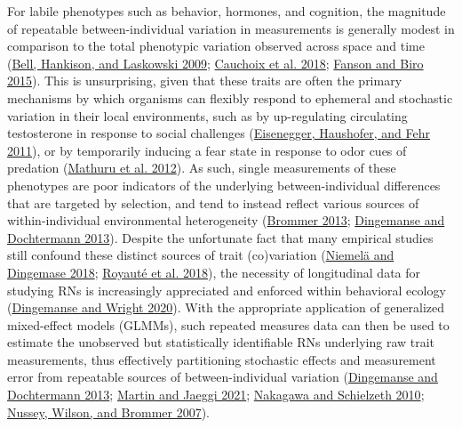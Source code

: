 \documentclass{article}
\begin{document}
For labile phenotypes such as behavior, hormones, and cognition, the
magnitude of repeatable between-individual variation in measurements is
generally modest in comparison to the total phenotypic variation
observed across space and time (\protect\hyperlink{ref-Bell2009}{Bell,
Hankison, and Laskowski 2009};
\protect\hyperlink{ref-Cauch2018}{Cauchoix et al. 2018};
\protect\hyperlink{ref-Fanson2019}{Fanson and Biro 2015}). This is
unsurprising, given that these traits are often the primary mechanisms
by which organisms can flexibly respond to ephemeral and stochastic
variation in their local environments, such as by up-regulating
circulating testosterone in response to social challenges
(\protect\hyperlink{ref-Eis2011}{Eisenegger, Haushofer, and Fehr 2011}),
or by temporarily inducing a fear state in response to odor cues of
predation (\protect\hyperlink{ref-Mathuru2012}{Mathuru et al. 2012}). As
such, single measurements of these phenotypes are poor indicators of the
underlying between-individual differences that are targeted by
selection, and tend to instead reflect various sources of
within-individual environmental heterogeneity
(\protect\hyperlink{ref-Brommer2013}{Brommer 2013};
\protect\hyperlink{ref-DingDocht2013}{Dingemanse and Dochtermann 2013}).
Despite the unfortunate fact that many empirical studies still confound
these distinct sources of trait (co)variation
(\protect\hyperlink{ref-Niem2018}{Niemelä and Dingemase 2018};
\protect\hyperlink{ref-Roy2018}{Royauté et al. 2018}), the necessity of
longitudinal data for studying RNs is increasingly appreciated and
enforced within behavioral ecology
(\protect\hyperlink{ref-Ding2020}{Dingemanse and Wright 2020}). With the
appropriate application of generalized mixed-effect models (GLMMs), such
repeated measures data can then be used to estimate the unobserved but
statistically identifiable RNs underlying raw trait measurements, thus
effectively partitioning stochastic effects and measurement error from
repeatable sources of between-individual variation
(\protect\hyperlink{ref-DingDocht2013}{Dingemanse and Dochtermann 2013};
\protect\hyperlink{ref-Martin2021}{Martin and Jaeggi 2021};
\protect\hyperlink{ref-Naka2010}{Nakagawa and Schielzeth 2010};
\protect\hyperlink{ref-Nus2007}{Nussey, Wilson, and Brommer 2007}).
\end{document}
